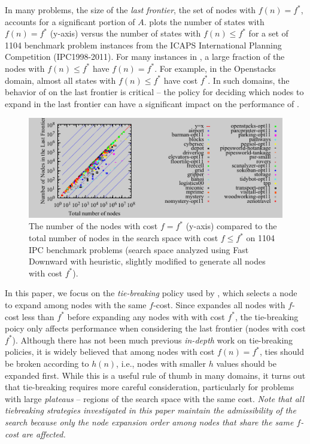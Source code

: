 In many problems, the size of the \emph{last frontier}, the set of nodes with $f(n)=f^*$, accounts for a significant portion of $A$.
 plots the number of states with $f(n) = f^*$ (y-axis)
versus the number of states with $f(n) \leq f^*$
for a set of 1104 benchmark problem instances from the ICAPS International Planning Competition (IPC1998-2011).
For many instances in ,  a large fraction of the nodes with $f(n) \leq f^*$ have $f(n)=f^*$.
For example, in the Openstacks domain, almost all states with $f(n) \leq f^*$ have cost $f^*$.
In such domains, the behavior of \astar on the last frontier is critical -- the policy for deciding which nodes to expand in the last frontier can have a significant impact on the performance of \astar.

\begin{figure}[htb]
 \centering {} 
 \includegraphics{tables/aaai16-frontier/aaai16prelim3/lmcut_frontier_noh-front.pdf}
 \caption{
 The number of the nodes with cost $f=f^*$ (y-axis) compared to the
 total number of nodes in the search space with cost $f\leq f^*$ on 1104 IPC benchmark problems
(search space analyzed using Fast Downward with \lmcut heuristic, slightly modified to generate all nodes with cost $f^*$).}
\label{fig:plateau-noh}
\end{figure}

In this paper, we focus on the \emph{tie-breaking} policy used by \astar, which selects a node to expand among nodes with the same $f$-cost.
Since \astar expandes all nodes with $f$-cost less than $f^*$ before expanding any nodes with with cost $f^*$, 
the tie-breaking poicy only affects performance when considering the last frontier (nodes with cost $f^*$).
Although there has not been much previous \emph{in-depth} work on tie-breaking policies,
it is widely believed that among nodes with cost $f(n) = f^*$, ties should be broken according to $h(n)$, i.e., nodes with smaller $h$ values should be expanded first.
While this is a useful rule of thumb in many domains,
it turns out that tie-breaking requires more careful consideration, particularly for problems with large \emph{plateaus} -- regions of the search space with the same cost.
\emph{Note that all tiebreaking strategies investigated in this paper maintain the admissibility of the search
because only the node expansion order among nodes that share the same $f$-cost are affected.}

